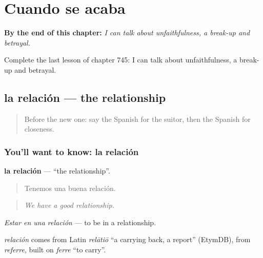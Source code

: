 
\chapter{Cuando se acaba}
\label{ch:es-cuando-se-acaba}

\begin{chapteropening}
\textbf{By the end of this chapter:} \emph{I can talk about unfaithfulness, a break-up and betrayal.}

Complete the last lesson of chapter 745: I can talk about unfaithfulness, a break-up and betrayal.
\end{chapteropening}

\section[la relación]{la relación — the relationship}

\label{lesson:ES-C745-relacion}



\begin{quote}
Before the new one: say the Spanish for the suitor, then the Spanish for closeness.
\end{quote}

\subsection*{You'll want to know: la relación}
\textbf{la relación} — \textquotedblleft{}the relationship\textquotedblright{}.

\begin{quote}
Tenemos una buena relación.
\end{quote}

\begin{quote}
\emph{We have a good relationship.}
\end{quote}

\emph{Estar en una relación} — to be in a relationship.

\begin{cousinweb}
\emph{relación} comes from Latin \emph{relātiō} \textquotedblleft{}a carrying back, a report\textquotedblright{} (EtymDB), from \emph{referre}, built on \emph{ferre} \textquotedblleft{}to carry\textquotedblright{}.
\end{cousinweb}


